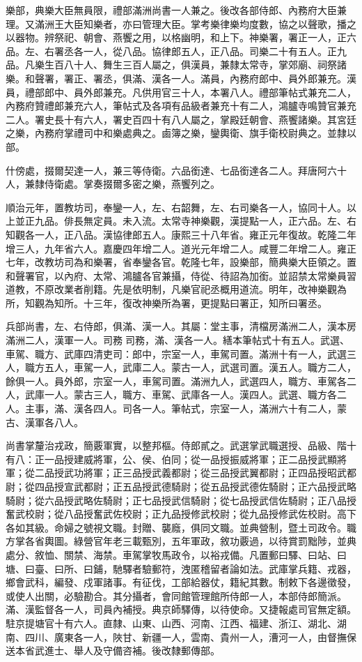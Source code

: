\begin{pinyinscope}
樂部，典樂大臣無員限，禮部滿洲尚書一人兼之。後改各部侍郎、內務府大臣兼理。又滿洲王大臣知樂者，亦曰管理大臣。掌考樂律樂均度數，協之以聲歌，播之以器物。辨祭祀、朝會、燕饗之用，以格幽明，和上下。神樂署，署正一人，正六品。左、右署丞各一人，從八品。協律郎五人，正八品。司樂二十有五人。正九品。凡樂生百八十人、舞生三百人屬之，俱漢員，兼隸太常寺，掌郊廟、祠祭諸樂。和聲署，署正、署丞，俱滿、漢各一人。滿員，內務府郎中、員外郎兼充。漢員，禮部郎中、員外郎兼充。凡供用官三十人，本署八人。禮部筆帖式兼充二人，內務府贊禮郎兼充六人，筆帖式及各項有品級者兼充十有二人，鴻臚寺鳴贊官兼充二人。署史長十有六人，署史百四十有八人屬之，掌殿廷朝會、燕饗諸樂。其宮廷之樂，內務府掌禮司中和樂處典之。鹵簿之樂，鑾輿衛、旗手衛校尉典之。並隸以部。

什傍處，掇爾契達一人，兼三等侍衛。六品銜達、七品銜達各二人。拜唐阿六十人，兼隸侍衛處。掌奏掇爾多密之樂，燕饗列之。

順治元年，置教坊司，奉鑾一人，左、右韶舞，左、右司樂各一人，協同十人。以上並正九品。俳長無定員。未入流。太常寺神樂觀，漢提點一人，正六品。左、右知觀各一人，正八品。漢協律郎五人。康熙三十八年省。雍正元年復故。乾隆二年增三人，九年省六人。嘉慶四年增二人。道光元年增二人。咸豐二年增二人。雍正七年，改教坊司為和樂署，省奉鑾各官。乾隆七年，設樂部，簡典樂大臣領之。置和聲署官，以內府、太常、鴻臚各官兼攝，侍從、待詔為加銜。並詔禁太常樂員習道教，不原改業者削籍。先是依明制，凡樂官祀丞概用道流。明年，改神樂觀為所，知觀為知所。十三年，復改神樂所為署，更提點曰署正，知所曰署丞。

兵部尚書，左、右侍郎，俱滿、漢一人。其屬：堂主事，清檔房滿洲二人，漢本房滿洲二人，漢軍一人。司務司務，滿、漢各一人。繕本筆帖式十有五人。武選、車駕、職方、武庫四清吏司：郎中，宗室一人，車駕司置。滿洲十有一人，武選三人，職方五人，車駕一人，武庫二人。蒙古一人，武選司置。漢五人。職方二人，餘俱一人。員外郎，宗室一人，車駕司置。滿洲九人，武選四人，職方、車駕各二人，武庫一人。蒙古三人，職方、車駕、武庫各一人。漢四人。武選、職方各二人。主事，滿、漢各四人。司各一人。筆帖式，宗室一人，滿洲六十有二人，蒙古、漢軍各八人。

尚書掌釐治戎政，簡覈軍實，以整邦樞。侍郎貳之。武選掌武職選授、品級、階十有八：正一品授建威將軍，公、侯、伯同；從一品授振威將軍；正二品授武顯將軍；從二品授武功將軍；正三品授武義都尉；從三品授武翼都尉；正四品授昭武都尉；從四品授宣武都尉；正五品授武德騎尉；從五品授武德佐騎尉；正六品授武略騎尉；從六品授武略佐騎尉；正七品授武信騎尉；從七品授武信佐騎尉；正八品授奮武校尉；從八品授奮武佐校尉；正九品授修武校尉；從九品授修武佐校尉。高下各如其級。命婦之號視文職。封贈、襲廕，俱同文職。並典營制，暨土司政令。職方掌各省輿圖。綠營官年老三載甄別，五年軍政，敘功覈過，以待賞罰黜陟，並典處分、敘恤、關禁、海禁。車駕掌牧馬政令，以裕戎備。凡置郵曰驛、曰站、曰塘、曰臺、曰所、曰鋪，馳驛者驗郵符，洩匿稽留者論如法。武庫掌兵籍、戎器，鄉會武科，編發、戍軍諸事。有征伐，工部給器仗，籍紀其數。制敕下各邊徵發，或使人出關，必驗勘合。其分攝者，會同館管理館所侍郎一人，本部侍郎簡派。滿、漢監督各一人，司員內補授。典京師驛傳，以待使命。又捷報處司官無定額。駐京提塘官十有六人。直隸、山東、山西、河南、江西、福建、浙江、湖北、湖南、四川、廣東各一人，陜甘、新疆一人，雲南、貴州一人，漕河一人，由督撫保送本省武進士、舉人及守備咨補。後改隸郵傳部。


\end{pinyinscope}
